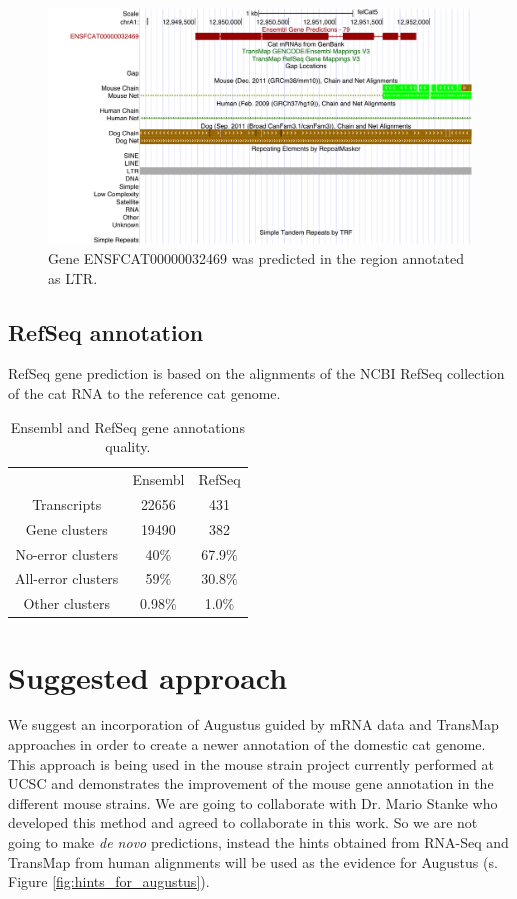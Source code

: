 \documentclass{article}
\begin{document}
\begin{figure}[h]
\centering
\includegraphics[width=\textwidth]{images/hgt_hgwdev_ede4_52c4e0.pdf}
\caption{Gene ENSFCAT00000032469 was predicted in the region annotated as LTR.}
\label{fig:gene_in_ltr}
\end{figure}


\subsection{RefSeq annotation}
RefSeq gene prediction is based on the alignments of the NCBI RefSeq collection of the cat RNA to the reference cat genome.

\begin{table}
\centering
\begin{tabular}{| c | c | c |}
\hline
&Ensembl&RefSeq\\

Transcripts& 22656 & 431\\

Gene clusters& 19490 & 382\\

No-error clusters & 40\% & 67.9\%\\

All-error clusters& 59\% & 30.8\%\\

Other clusters& 0.98\% & 1.0\%\\
\hline
\end{tabular}
\caption{Ensembl and RefSeq gene annotations quality.}
\label{table:ensembl_refseq_stats}
\end{table}

\section{Suggested approach}
We suggest an incorporation of Augustus guided by mRNA data and TransMap approaches in order to create a newer annotation of the domestic cat genome. This approach is being used in the mouse strain project currently performed at UCSC and demonstrates the improvement of the mouse gene annotation in the different mouse strains. We are going to collaborate with Dr. Mario Stanke who developed this method and agreed to collaborate in this work.
So we are not going to make \textit{de novo} predictions, instead the hints obtained from RNA-Seq and TransMap from human alignments will be used as the evidence for Augustus (s. Figure \ref{fig:hints_for_augustus}). 
\end{document}
